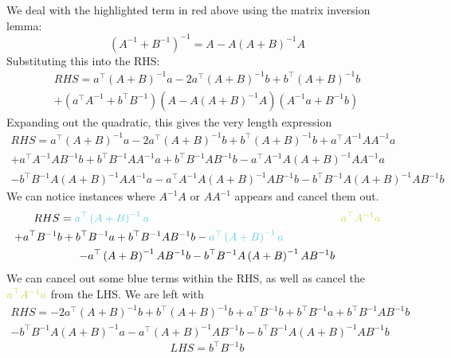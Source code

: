 \documentclass[11pt]{report} %
\begin{document}
We deal with the highlighted term in \red red \black above using the matrix inversion lemma:
\begin{equation}
\left(A^{-1}+B^{-1}\right)^{-1}=A-A\left(A+B\right)^{-1}A
\end{equation}
Substituting this into the RHS:
\begin{multline}
RHS=a^{\top}\left(A+B\right)^{-1}a-2a^{\top}\left(A+B\right)^{-1}b+b^{\top}\left(A+B\right)^{-1}b \\
+\left(a^{\top}A^{-1}+b^{\top}B^{-1}\right)\left(A-A\left(A+B\right)^{-1}A\right)\left(A^{-1}a+B^{-1}b\right)
\end{multline}
Expanding out the quadratic, this gives the very length expression
\begin{multline}
RHS=a^{\top}\left(A+B\right)^{-1}a-2a^{\top}\left(A+B\right)^{-1}b+b^{\top}\left(A+B\right)^{-1}b+a^{\top}A^{-1}AA^{-1}a \\
+a^{\top}A^{-1}AB^{-1}b+b^{\top}B^{-1}AA^{-1}a+b^{\top}B^{-1}AB^{-1}b-a^{\top}A^{-1}A\left(A+B\right)^{-1}AA^{-1}a \\
-b^{\top}B^{-1}A\left(A+B\right)^{-1}AA^{-1}a-a^{\top}A^{-1}A\left(A+B\right)^{-1}AB^{-1}b-b^{\top}B^{-1}A\left(A+B\right)^{-1}AB^{-1}b
\end{multline}
We can notice instances where $A^{-1}A$ or $AA^{-1}$ appears and cancel them out.
\begin{multline}
RHS=\blue a^{\top}\left(A+B\right)^{-1}a\black -2a^{\top}\left(A+B\right)^{-1}b+b^{\top}\left(A+B\right)^{-1}b+ \green a^{\top}A^{-1}a \black \\
+a^{\top}B^{-1}b+b^{\top}B^{-1}a+b^{\top}B^{-1}AB^{-1}b- \blue a^{\top}\left(A+B\right)^{-1}a\black -b^{\top}B^{-1}A\left(A+B\right)^{-1}a \\
-a^{\top}\left(A+B\right)^{-1}AB^{-1}b-b^{\top}B^{-1}A\left(A+B\right)^{-1}AB^{-1}b
\end{multline}
We can cancel out some \blue blue \black terms within the RHS, as well as cancel the $\green a^{\top}A^{-1}a \black$ from the LHS. We are left with
\begin{multline}
RHS=-2a^{\top}\left(A+B\right)^{-1}b+b^{\top}\left(A+B\right)^{-1}b+a^{\top}B^{-1}b+b^{\top}B^{-1}a+b^{\top}B^{-1}AB^{-1}b \\
-b^{\top}B^{-1}A\left(A+B\right)^{-1}a-a^{\top}\left(A+B\right)^{-1}AB^{-1}b-b^{\top}B^{-1}A\left(A+B\right)^{-1}AB^{-1}b
\end{multline}
\begin{equation}
LHS=b^{\top}B^{-1}b
\end{equation}
\end{document}
